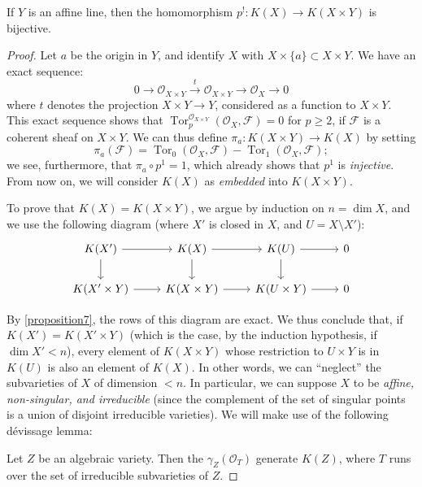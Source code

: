 \documentclass{article}
\theoremstyle{plain}
\newenvironment{proposition}[1]
    {\renewcommand\theinnercustomproposition{#1}\innercustomproposition}
    {\endinnercustomproposition}
\newenvironment{lemma}[1]
    {\renewcommand\theinnercustomlemma{#1}\innercustomlemma}
    {\endinnercustomlemma}
\theoremstyle{definition}
\newcommand{\sh}{\mathscr}
\renewcommand{\geq}{\geqslant}
\DeclareMathOperator{\Tor}{Tor}
\newcommand{\oldpage}[1]{\marginpar{\footnotesize$\Big\vert$ \textit{p.~#1}}}
\begin{document}
\begin{proposition}{8}
\label{proposition8}
  If $Y$ is an affine line, then the homomorphism $p^!\colon K(X)\to K(X\times Y)$ is bijective.
\end{proposition}

\begin{proof}
  Let $a$ be the origin in $Y$, and identify $X$ with $X\times\{a\}\subset X\times Y$.
  We have an exact sequence:
  \[
    0 \to \sh{O}_{X\times Y} \xrightarrow{t} \sh{O}_{X\times Y} \to \sh{O}_X \to 0
  \]
  where $t$ denotes the projection $X\times Y\to Y$, considered as a function to $X\times Y$.
  This exact sequence shows that $\Tor_p^{\sh{O}_{X\times Y}}(\sh{O}_X,\sh{F})=0$ for $p\geq2$, if $\sh{F}$ is a coherent sheaf on $X\times Y$.
  We can thus define $\pi_a\colon K(X\times Y)\to K(X)$ by setting
  \[
    \pi_a(\sh{F}) = \Tor_0(\sh{O}_X,\sh{F}) - \Tor_1(\sh{O}_X,\sh{F});
  \]
  we see, furthermore, that $\pi_a\circ p^1=1$, which already shows that $p^1$ is \emph{injective}.
  From now on, we will consider $K(X)$ as \emph{embedded} into $K(X\times Y)$.

  To prove that $K(X)=K(X\times Y)$, we argue by induction on $n=\dim X$, and we use the following diagram (where $X'$ is closed in $X$, and $U=X\setminus X'$):
  \[
    \begin{tikzcd}
      K(X') \rar \dar
      & K(X) \rar \dar
      & K(U) \rar \dar
      & 0
    \\K(X'\times Y) \rar
      & K(X\times Y) \rar
      & K(U\times Y) \rar
      & 0
    \end{tikzcd}
  \]

\oldpage{117}
  By \cref{proposition7}, the rows of this diagram are exact.
  We thus conclude that, if $K(X')=K(X'\times Y)$ (which is the case, by the induction hypothesis, if $\dim X'<n$), every element of $K(X\times Y)$ whose restriction to $U\times Y$ is in $K(U)$ is also an element of $K(X)$.
  In other words, we can ``neglect'' the subvarieties of $X$ of dimension $<n$.
  In particular, we can suppose $X$ to be \emph{affine, non-singular, and irreducible} (since the complement of the set of singular points is a union of disjoint irreducible varieties).
  We will make use of the following d\'{e}vissage lemma:

  \begin{lemma}{17}
  \label{lemma17}
    Let $Z$ be an algebraic variety.
    Then the $\gamma_Z(\sh{O}_T)$ generate $K(Z)$, where $T$ runs over the set of irreducible subvarieties of $Z$.
  \end{lemma}


\end{proof}
\end{document}
